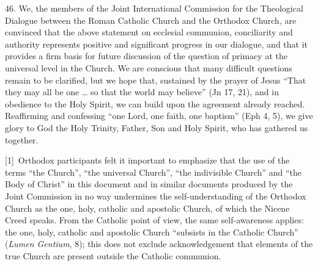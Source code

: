 46. We, the members of the Joint International Commission for the
Theological Dialogue between the Roman Catholic Church and the Orthodox
Church, are convinced that the above statement on ecclesial communion,
conciliarity and authority represents positive and significant progress
in our dialogue, and that it provides a firm basis for future discussion
of the question of primacy at the universal level in the Church. We are
conscious that many difficult questions remain to be clarified, but we
hope that, sustained by the prayer of Jesus ``That they may all be one
\ldots{} so that the world may believe'' (Jn 17, 21), and in obedience
to the Holy Spirit, we can build upon the agreement already reached.
Reaffirming and confessing ``one Lord, one faith, one baptism'' (Eph 4,
5), we give glory to God the Holy Trinity, Father, Son and Holy Spirit,
who has gathered us together.

\label{_ftn1}{}{[}1{]}~Orthodox participants felt it
important to emphasize that the use of the terms ``the Church'', ``the
universal Church'', ``the indivisible Church'' and ``the Body of
Christ'' in this document and in similar documents produced by the Joint
Commission in no way undermines the self-understanding of the Orthodox
Church as the one, holy, catholic and apostolic Church, of which the
Nicene Creed speaks. From the Catholic point of view, the same
self-awareness applies: the one, holy, catholic and apostolic Church
``subsists in the Catholic Church'' (\emph{Lumen Gentium}, 8); this does
not exclude acknowledgement that elements of the true Church are present
outside the Catholic communion.
